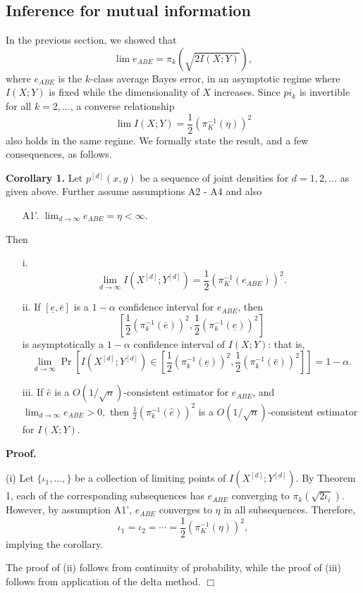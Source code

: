 \documentclass[12pt]{article}
\begin{document}
\subsection{Inference for mutual information}

In the previous section, we showed that
\[
\lim e_{ABE} = \pi_k(\sqrt{2 I(X; Y)}),
\]
where $e_{ABE}$ is the $k$-class average Bayes error,
in an asymptotic regime where $I(X; Y)$ is fixed while the dimensionality of $X$ increases.
Since $pi_k$ is invertible for all $k = 2, \hdots$,
a converse relationship
\[
\lim I(X; Y) = \frac{1}{2}(\pi_K^{-1}(\eta))^2
\]
also holds in the same regime.  We formally state the result, and a few consequences, as follows.

\textbf{Corollary 1.}
Let $p^{[d]}(x, y)$ be a sequence of joint densities
for $d = 1,2,\hdots$ as given above.  Further assume assumptions A2 - A4 and also
\begin{itemize}
\item[A1'.] $\lim_{d \to \infty} e_{ABE} = \eta < \infty.$
\end{itemize}
Then
\begin{itemize}
\item[i.]
\[
\lim_{d \to \infty} I(X^{[d]}; Y^{[d]}) = \frac{1}{2}(\pi_K^{-1}(e_{ABE}))^2.
\]
\item[ii.]
If $[\underline{e}, \bar{e}]$ is a $1-\alpha$ confidence interval for $e_{ABE}$,
then
\[
[\frac{1}{2}(\pi_k^{-1}(\bar{e}))^2, \frac{1}{2}(\pi_k^{-1}(\underline{e}))^2]
\]
is asymptotically a $1-\alpha$ confidence interval of $I(X; Y)$: that is,
\[
\lim_{d \to \infty} \Pr\left[I(X^{[d]}; Y^{[d]}) \in [\frac{1}{2}(\pi_k^{-1}(\underline{e}))^2, \frac{1}{2}(\pi_k^{-1}(\bar{e}))^2]\right] = 1-\alpha.
\]
\item[iii.] If $\hat{e}$ is a $O(1/\sqrt{n})$-consistent estimator for $e_{ABE}$,
and $\lim_{d \to \infty} e_{ABE} > 0,$
then $\frac{1}{2}(\pi_k^{-1}(\hat{e}))^2$ is a $O(1/\sqrt{n})$-consistent estimator for $I(X; Y)$.
\end{itemize}

\textbf{Proof.} 

(i) Let $\{\iota_1,\hdots, \}$ be a collection of limiting points of $I(X^{[d]}; Y^{[d]})$.
By Theorem 1, each of the corresponding subsequences has $e_{ABE}$ converging to
$\pi_k(\sqrt{2 \iota_i})$.  However, by assumption A1', $e_{ABE}$ converges to $\eta$ in
all subsequences.  Therefore, 
\[\iota_1 = \iota_2 = \cdots = \frac{1}{2}(\pi_K^{-1}(\eta))^2,\]
implying the corollary.

The proof of (ii) follows from continuity of probability, while the proof of (iii) follows from application of the delta method.  $\Box$
\end{document}
